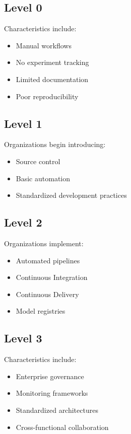 \subsection{Level 0}

Characteristics include:

\begin{itemize}
    \item Manual workflows
    \item No experiment tracking
    \item Limited documentation
    \item Poor reproducibility
\end{itemize}

\subsection{Level 1}

Organizations begin introducing:

\begin{itemize}
    \item Source control
    \item Basic automation
    \item Standardized development practices
\end{itemize}

\subsection{Level 2}

Organizations implement:

\begin{itemize}
    \item Automated pipelines
    \item Continuous Integration
    \item Continuous Delivery
    \item Model registries
\end{itemize}

\subsection{Level 3}

Characteristics include:

\begin{itemize}
    \item Enterprise governance
    \item Monitoring frameworks
    \item Standardized architectures
    \item Cross-functional collaboration
\end{itemize}

